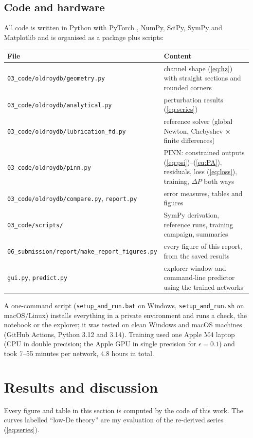 \documentclass[11pt,a4paper]{article}
\newcommand{\code}[1]{\texttt{#1}}
\begin{document}
\subsection{Code and hardware}
All code is written in Python with PyTorch \cite{paszke2019}, NumPy, SciPy, SymPy and Matplotlib and is organised as a package plus scripts:
\begin{center}\small
\begin{tabularx}{\linewidth}{@{}lX@{}}
\toprule
File & Content\\
\midrule
\code{03\_code/oldroydb/geometry.py} & channel shape (\ref{eq:hz}) with straight sections and rounded corners\\
\code{03\_code/oldroydb/analytical.py} & perturbation results (\ref{eq:series})\\
\code{03\_code/oldroydb/lubrication\_fd.py} & reference solver (global Newton, Chebyshev $\times$ finite differences)\\
\code{03\_code/oldroydb/pinn.py} & PINN: constrained outputs (\ref{eq:psi})--(\ref{eq:PA}), residuals, loss (\ref{eq:loss}), training, $\Delta P$ both ways\\
\code{03\_code/oldroydb/compare.py}, \code{report.py} & error measures, tables and figures\\
\code{03\_code/scripts/} & SymPy derivation, reference runs, training campaign, summaries\\
\code{06\_submission/report/make\_report\_figures.py} & every figure of this report, from the saved results\\
\code{gui.py}, \code{predict.py} & explorer window and command-line predictor using the trained networks\\
\bottomrule
\end{tabularx}
\end{center}
A one-command script (\code{setup\_and\_run.bat} on Windows, \code{setup\_and\_run.sh} on macOS/Linux) installs everything in a private environment and runs a check, the notebook or the explorer; it was tested on clean Windows and macOS machines (GitHub Actions, Python 3.12 and 3.14). Training used one Apple M4 laptop (CPU in double precision; the Apple GPU in single precision for $\epsilon=0.1$) and took 7--55 minutes per network, 4.8 hours in total.

\section{Results and discussion}
Every figure and table in this section is computed by the code of this work. The curves labelled ``low-De theory'' are my evaluation of the re-derived series (\ref{eq:series}).
\end{document}
